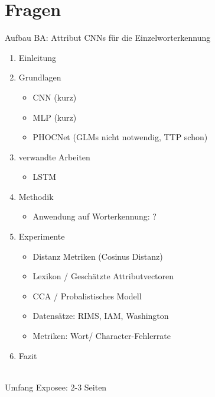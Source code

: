 \section{Fragen}

Aufbau BA: Attribut CNNs für die Einzelworterkennung

\begin{enumerate}
    \item Einleitung
    \item Grundlagen
        \begin{itemize}
            \item CNN (kurz)
            \item MLP (kurz)
            \item PHOCNet (GLMs nicht notwendig, TTP schon)
        \end{itemize}
    \item verwandte Arbeiten
        \begin{itemize}
            \item LSTM
        \end{itemize}
    \item Methodik
        \begin{itemize}
            \item Anwendung auf Worterkennung: ?
        \end{itemize}
    \item Experimente
        \begin{itemize}
            \item Distanz Metriken (Cosinus Distanz)
            \item Lexikon / Geschätzte Attributvectoren
            \item CCA / Probalistisches Modell
            \item Datensätze: RIMS, IAM, Washington
            \item Metriken: Wort/ Character-Fehlerrate
        \end{itemize}
    \item Fazit
\end{enumerate}
\ \\
Umfang Exposee: 2-3 Seiten\\
